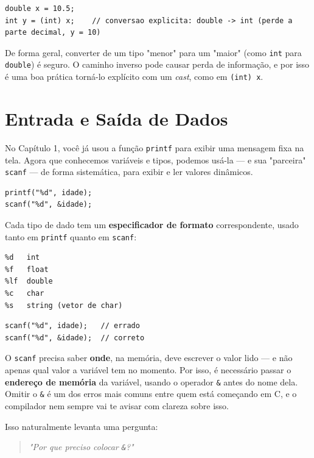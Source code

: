 \begin{lstlisting}
double x = 10.5;
int y = (int) x;    // conversao explicita: double -> int (perde a parte decimal, y = 10)
\end{lstlisting}

De forma geral, converter de um tipo "menor" para um "maior" (como \texttt{int} para \texttt{double}) é seguro. O caminho inverso pode causar perda de informação, e por isso é uma boa prática torná-lo explícito com um \textit{cast}, como em \texttt{(int) x}.

\section{Entrada e Saída de Dados}
No Capítulo 1, você já usou a função \texttt{printf} para exibir uma mensagem fixa na tela. Agora que conhecemos variáveis e tipos, podemos usá-la — e sua "parceira" \texttt{scanf} — de forma sistemática, para exibir e ler valores dinâmicos.

\begin{lstlisting}
printf("%d", idade);
scanf("%d", &idade);
\end{lstlisting}

Cada tipo de dado tem um \textbf{especificador de formato} correspondente, usado tanto em \texttt{printf} quanto em \texttt{scanf}:

\begin{lstlisting}
%d   int
%f   float
%lf  double
%c   char
%s   string (vetor de char)
\end{lstlisting}

\begin{errocomum}
\begin{lstlisting}
scanf("%d", idade);   // errado
scanf("%d", &idade);  // correto
\end{lstlisting}
O \texttt{scanf} precisa saber \textbf{onde}, na memória, deve escrever o valor lido — e não apenas qual valor a variável tem no momento. Por isso, é necessário passar o \textbf{endereço de memória} da variável, usando o operador \texttt{\&} antes do nome dela. Omitir o \texttt{\&} é um dos erros mais comuns entre quem está começando em C, e o compilador nem sempre vai te avisar com clareza sobre isso.
\end{errocomum}

Isso naturalmente levanta uma pergunta:

\begin{quote}
\textit{"Por que preciso colocar \texttt{\&}?"}
\end{quote}

